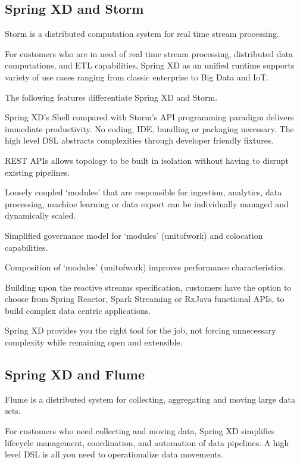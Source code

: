 \subsection{Spring XD and Storm}
Storm is a distributed computation system for real time stream processing.

For customers who are in need of real time stream processing, distributed data computations, and ETL capabilities, Spring XD as an unified runtime supports variety of use cases ranging from classic enterprise to Big Data and IoT. 

The following features differentiate Spring XD and Storm.

\begin{itemize*}
\item Spring XD's Shell compared with Storm's API programming paradigm delivers immediate productivity. No coding, IDE, bundling or packaging necessary. The high level DSL abstracts complexities through developer friendly fixtures.
\item REST APIs allows topology to be built in isolation without having to disrupt existing pipelines.
\item Loosely coupled `modules' that are responsible for ingestion, analytics, data processing, machine learning or data export can be individually managed and dynamically scaled.
\item Simplified governance model for `modules' (unit\-of\-work) and colocation capabilities.
\item Composition of `modules' (unit\-of\-work) improves performance characteristics. 
\item Building upon the reactive streams specification, customers have the option to choose from Spring Reactor, Spark Streaming or RxJava functional APIs, to build complex data centric applications.
\end{itemize*}

Spring XD provides you the right tool for the job, not forcing unnecessary complexity while remaining open and extensible.

\subsection{Spring XD and Flume}
Flume is a distributed system for collecting, aggregating and moving large data sets. 

For customers who need collecting and moving data, Spring XD simplifies lifecycle management, coordination, and automation of data pipelines. A high level DSL is all you need to operationalize data movements. 

